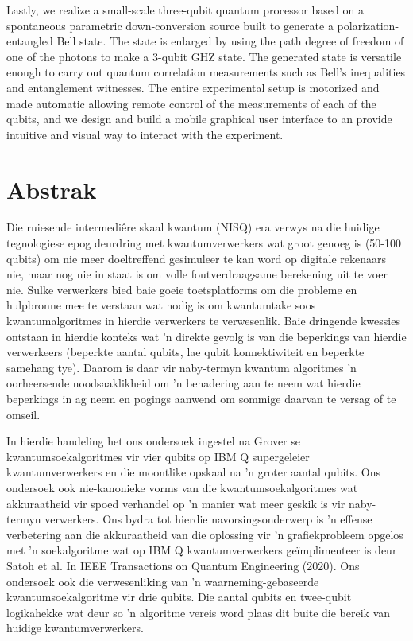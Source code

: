 \bigskip
\noindent
Lastly, we realize a small-scale three-qubit quantum processor based on a spontaneous parametric down-conversion source built to generate a polarization-entangled Bell state. The state is enlarged by using the path degree of freedom of one of the photons to make a $3$-qubit GHZ state. The generated state is versatile enough to carry out quantum correlation measurements such as Bell's inequalities and entanglement witnesses. The entire experimental setup is motorized and made automatic allowing remote control of the measurements of each of the qubits, and we design and build a mobile graphical user interface to an provide intuitive and visual way to interact with the experiment.

\chapter*{Abstrak}
Die ruiesende intermediêre skaal kwantum (NISQ) era verwys na die huidige tegnologiese epog deurdring met kwantumverwerkers wat groot genoeg is (50-100 qubits) om nie meer doeltreffend gesimuleer te kan word op digitale rekenaars nie, maar nog nie in staat is om volle foutverdraagsame berekening uit te voer nie. Sulke verwerkers bied baie goeie toetsplatforms om die probleme en hulpbronne mee te verstaan wat nodig is om kwantumtake soos kwantumalgoritmes in hierdie verwerkers te verwesenlik. Baie dringende kwessies ontstaan in hierdie konteks wat 'n direkte gevolg is van die beperkings van hierdie verwerkeers (beperkte aantal qubits, lae qubit konnektiwiteit en beperkte samehang tye). Daarom is daar vir naby-termyn kwantum algoritmes 'n oorheersende noodsaaklikheid om 'n benadering aan te neem wat hierdie beperkings in ag neem en pogings aanwend om sommige daarvan te versag of te omseil.


\bigskip
\noindent
In hierdie handeling het ons ondersoek ingestel na Grover se kwantumsoekalgoritmes vir vier qubits op IBM Q supergeleier kwantumverwerkers en die moontlike opskaal na 'n groter aantal qubits. Ons ondersoek ook nie-kanonieke vorms van die kwantumsoekalgoritmes wat akkuraatheid vir spoed verhandel op 'n manier wat meer geskik is vir naby-termyn verwerkers. Ons bydra tot hierdie navorsingsonderwerp is 'n effense verbetering aan die akkuraatheid van die oplossing vir 'n grafiekprobleem opgelos met 'n soekalgoritme wat op IBM Q kwantumverwerkers geïmplimenteer is deur Satoh et al. In IEEE Transactions on Quantum Engineering (2020). Ons ondersoek ook die verwesenliking van 'n waarneming-gebaseerde kwantumsoekalgoritme vir drie qubits. Die aantal qubits en twee-qubit logikahekke wat deur so 'n algoritme vereis word plaas dit buite die bereik van huidige kwantumverwerkers.


